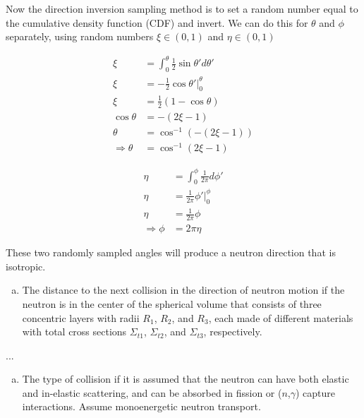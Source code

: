 \documentclass[10pt]{article}
\begin{document}
Now the direction inversion sampling method is to set a random number equal to the cumulative density function (CDF) and invert. We can do this for $\theta$ and $\phi$ separately, using random numbers $\xi \in (0,1)$ and $\eta \in (0,1)$

\begin{minipage}{.5\linewidth}
\begin{align*}
\xi &= \int_0^\theta \frac{1}{2} \sin\theta ' d\theta ' \\
\xi & = -\frac{1}{2} \cos\theta ' \Big|_0^\theta \\
\xi & = \frac{1}{2} (1-\cos\theta ) \\
\cos\theta &= -(2\xi - 1)  \\
\theta &= \cos^{-1}(-(2\xi -1)) \\
\Rightarrow \theta &= \cos^{-1}(2\xi -1)
\end{align*}
\end{minipage}%
\begin{minipage}{.5\linewidth}
\begin{align*}
\eta &= \int_0^\phi \frac{1}{2\pi} d\phi ' \\
\eta &= \frac{1}{2\pi} \phi ' \Big|_0^{\phi} \\
\eta &= \frac{1}{2\pi} \phi \\
\Rightarrow \phi &= 2\pi \eta
\end{align*}
\end{minipage}
\vspace{10pt}

These two randomly sampled angles will produce a neutron direction that is isotropic.

%
%
%

\begin{enumerate}[(b)]
	\item The distance to the next collision in the direction of neutron motion if the neutron is in the center of the spherical volume that consists of three concentric layers with radii $R_1$, $R_2$, and $R_3$, each made of different materials with total cross sections $\Sigma_{t1}$, $\Sigma_{t2}$, and $\Sigma_{t3}$, respectively.
\end{enumerate}

...

%
%
%

\begin{enumerate}[(c)]
	\item The type of collision if it is assumed that the neutron can have both elastic and in-elastic scattering, and can be absorbed in fission or ($n$,$\gamma$) capture interactions. Assume monoenergetic neutron transport.
\end{enumerate}
\end{document}
